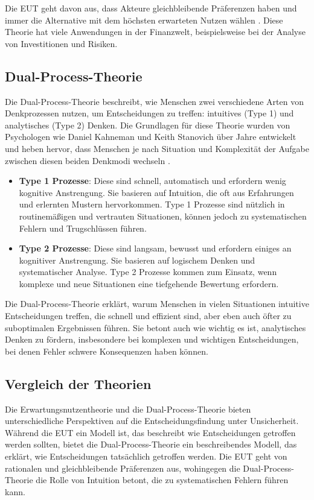 Die EUT geht davon aus, dass Akteure gleichbleibende Präferenzen haben und immer die Alternative mit dem höchsten erwarteten Nutzen wählen \cite{vonNeumann1944}. Diese Theorie hat viele Anwendungen in der Finanzwelt, beispielsweise bei der Analyse von Investitionen und Risiken.

\subsection{Dual-Process-Theorie}

Die Dual-Process-Theorie beschreibt, wie Menschen zwei verschiedene Arten von Denkprozessen nutzen, um Entscheidungen zu treffen: intuitives (Type 1) und analytisches (Type 2) Denken. Die Grundlagen für diese Theorie wurden von Psychologen wie Daniel Kahneman und Keith Stanovich über Jahre entwickelt und heben hervor, dass Menschen je nach Situation und Komplexität der Aufgabe zwischen diesen beiden Denkmodi wechseln \cite{Tversky74}.

\begin{itemize}
    \item \textbf{Type 1 Prozesse}: Diese sind schnell, automatisch und erfordern wenig kognitive Anstrengung. Sie basieren auf Intuition, die oft aus Erfahrungen und erlernten Mustern hervorkommen. Type 1 Prozesse sind nützlich in routinemäßigen und vertrauten Situationen, können jedoch zu systematischen Fehlern und Trugschlüssen führen.
    \item \textbf{Type 2 Prozesse}: Diese sind langsam, bewusst und erfordern einiges an kognitiver Anstrengung. Sie basieren auf logischem Denken und systematischer Analyse. Type 2 Prozesse kommen zum Einsatz, wenn komplexe und neue Situationen eine tiefgehende Bewertung erfordern.
\end{itemize}

Die Dual-Process-Theorie erklärt, warum Menschen in vielen Situationen intuitive Entscheidungen treffen, die schnell und effizient sind, aber eben auch öfter zu suboptimalen Ergebnissen führen. Sie betont auch wie wichtig es ist, analytisches Denken zu fördern, insbesondere bei komplexen und wichtigen Entscheidungen, bei denen Fehler schwere Konsequenzen haben können.

\subsection{Vergleich der Theorien}

Die Erwartungsnutzentheorie und die Dual-Process-Theorie bieten unterschiedliche Perspektiven auf die Entscheidungsfindung unter Unsicherheit. Während die EUT ein Modell ist, das beschreibt wie Entscheidungen getroffen werden sollten, bietet die Dual-Process-Theorie ein beschreibendes Modell, das erklärt, wie Entscheidungen tatsächlich getroffen werden. Die EUT geht von rationalen und gleichbleibende Präferenzen aus, wohingegen die Dual-Process-Theorie die Rolle von Intuition betont, die zu systematischen Fehlern führen kann.

